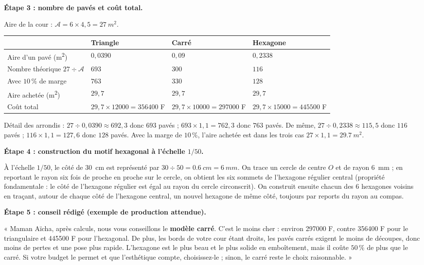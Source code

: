 \documentclass[11pt]{article}
\begin{document}
\begin{exoresolu}
\textbf{Étape 3 : nombre de pavés et coût total.}

Aire de la cour : $\mathcal{A} = 6 \times 4,5 = \SI{27}{m^2}$.

\begin{center}
\begin{tabularx}{\linewidth}{|l|X|X|X|}\hline
\rowcolor{popblueL} & \textbf{Triangle} & \textbf{Carré} & \textbf{Hexagone} \\ \hline
Aire d'un pavé (m\textsuperscript{2}) & $0,0390$ & $0,09$ & $0,2338$ \\ \hline
Nombre théorique $27 \div \mathcal{A}$ & $693$ & $300$ & $116$ \\ \hline
Avec $10\,\%$ de marge & $763$ & $330$ & $128$ \\ \hline
Aire achetée (m\textsuperscript{2}) & $29,7$ & $29,7$ & $29,7$ \\ \hline
Coût total & $29,7\times\num{12000} = \num{356400}$ F & $29,7\times\num{10000} = \num{297000}$ F & $29,7\times\num{15000} = \num{445500}$ F \\ \hline
\end{tabularx}
\end{center}

Détail des arrondis : $27 \div 0,0390 \approx 692,3$ donc $693$ pavés ; $693 \times 1,1 = 762,3$ donc $763$ pavés. De même, $27 \div 0,2338 \approx 115,5$ donc $116$ pavés ; $116 \times 1,1 = 127,6$ donc $128$ pavés. Avec la marge de $10\,\%$, l'aire achetée est dans les trois cas $27 \times 1,1 = \SI{29,7}{m^2}$.

\textbf{Étape 4 : construction du motif hexagonal à l'échelle $1/50$.}

À l'échelle $1/50$, le côté de \SI{30}{cm} est représenté par $30 \div 50 = \SI{0,6}{cm} = \SI{6}{mm}$. On trace un cercle de centre $O$ et de rayon \SI{6}{mm} ; en reportant le rayon six fois de proche en proche sur le cercle, on obtient les six sommets de l'hexagone régulier central (propriété fondamentale : le côté de l'hexagone régulier est égal au rayon du cercle circonscrit). On construit ensuite chacun des 6 hexagones voisins en traçant, autour de chaque côté de l'hexagone central, un nouvel hexagone de même côté, toujours par reports du rayon au compas.

\textbf{Étape 5 : conseil rédigé (exemple de production attendue).}

« Maman Aïcha, après calculs, nous vous conseillons le \textbf{modèle carré}. C'est le moins cher : environ \num{297000} F, contre \num{356400} F pour le triangulaire et \num{445500} F pour l'hexagonal. De plus, les bords de votre cour étant droits, les pavés carrés exigent le moins de découpes, donc moins de pertes et une pose plus rapide. L'hexagone est le plus beau et le plus solide en emboîtement, mais il coûte $50\,\%$ de plus que le carré. Si votre budget le permet et que l'esthétique compte, choisissez-le ; sinon, le carré reste le choix raisonnable. »
\end{exoresolu}
\end{document}
